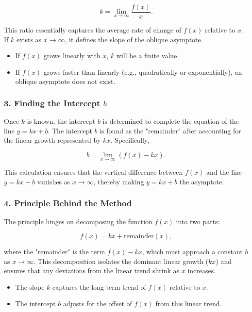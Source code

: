 \documentclass[a4paper,12pt]{article}
\begin{document}
\[
k = \lim_{x \to \infty} \frac{f(x)}{x}.
\]

This ratio essentially captures the average rate of change of \( f(x) \) relative to \( x \). If \( k \) exists as \( x \to \infty \), it defines the slope of the oblique asymptote.
\begin{itemize}
\item 
If \( f(x) \) grows linearly with \( x \), \( k \) will be a finite value.

\item 
If \( f(x) \) grows faster than linearly (e.g., quadratically or exponentially), an oblique asymptote does not exist.

\end{itemize}

\subsubsection{3. Finding the Intercept \( b \)}

Once \( k \) is known, the intercept \( b \) is determined to complete the equation of the line \( y = kx + b \). The intercept \( b \) is found as the "remainder" after accounting for the linear growth represented by \( kx \). Specifically,

\[
b = \lim_{x \to \infty} \left(f(x) - kx\right).
\]

This calculation ensures that the vertical difference between \( f(x) \) and the line \( y = kx + b \) vanishes as \( x \to \infty \), thereby making \( y = kx + b \) the asymptote.

\subsubsection{4. Principle Behind the Method}

The principle hinges on decomposing the function \( f(x) \) into two parts:

\[
f(x) = kx + \text{remainder}(x),
\]

where the "remainder" is the term \( f(x) - kx \), which must approach a constant \( b \) as \( x \to \infty \). This decomposition isolates the dominant linear growth (\( kx \)) and ensures that any deviations from the linear trend shrink as \( x \) increases.
\begin{itemize}
\item 
The slope \( k \) captures the long-term trend of \( f(x) \) relative to \( x \).

\item 
The intercept \( b \) adjusts for the offset of \( f(x) \) from this linear trend.

\end{itemize}
\end{document}
